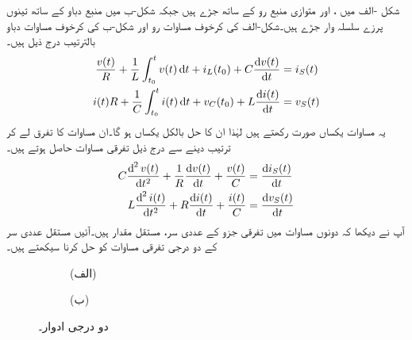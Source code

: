 شکل -الف میں ،  اور  متوازی منبع رو  کے ساتھ جڑے ہیں جبکہ شکل-ب میں منبع دباو کے ساتھ تینوں پرزے سلسلہ وار جڑے ہیں۔شکل-الف کی کرخوف مساوات رو اور شکل-ب کی کرخوف مساوات دباو بالترتیب درج ذیل ہیں۔
\begin{align*}
\frac{v(t)}{R}+\frac{1}{L}\int_{t_0}^{t} v(t)\dif t+i_L(t_0)+ C\frac{\dif v(t)}{\dif t}&=i_S(t)\\
i(t) R+\frac{1}{C}\int_{t_0}^{t} i(t)\dif t+v_C(t_0)+L \frac{\dif i(t)}{\dif t}&=v_S(t)
\end{align*}
یہ مساوات یکساں صورت رکھتے ہیں لہٰذا ان کا حل بالکل یکساں ہو گا۔ان مساوات کا تفرق لے کر ترتیب دینے سے درج ذیل تفرقی مساوات حاصل ہوتے ہیں۔
\begin{align*}
C\frac{\dif^{\,2} v(t)}{\dif t^2}+\frac{1}{R}\frac{\dif v(t)}{\dif t}+\frac{v(t)}{C}&=\frac{\dif i_S(t)}{\dif t}\\
L\frac{\dif^{\,2} i(t)}{\dif t^2}+R\frac{\dif i(t)}{\dif t}+\frac{i(t)}{C}&=\frac{\dif v_S(t)}{\dif t}
\end{align*}
آپ نے دیکھا کہ دونوں مساوات میں تفرقی جزو کے عددی سر، مستقل مقدار ہیں۔آئیں مستقل عددی سر کے دو درجی تفرقی مساوات کو حل کرنا سیکھتے ہیں۔
 \begin{figure}
\centering
\begin{subfigure}{0.5\textwidth}
\centering
{}%
\caption*{(الف)}
\end{subfigure}
\begin{subfigure}{0.5\textwidth}
\centering
{}%
\caption*{(ب)}
\end{subfigure}
\caption{دو درجی ادوار۔}
\label{شکل_عارضی_دو_درجی_ادوار}
\end{figure}

